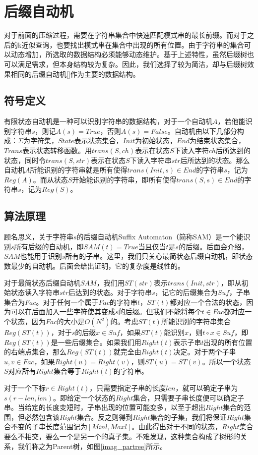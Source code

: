 ﻿\documentclass{sysuthesis}
\begin{document}
\chapter{后缀自动机}
对于前面的压缩过程，需要在字符串集合中快速匹配模式串的最长前缀。而对于之后的k近似查询，也要找出模式串在集合中出现的所有位置。由于字符串的集合可以动态增加，所选取的数据结构必须能够动态维护。基于上述特性，虽然后缀树也可以满足需求，但本身结构较为复杂。因此，我们选择了较为简洁，却与后缀树效果相同的后缀自动机[]作为主要的数据结构。



\section{符号定义}
有限状态自动机是一种可以识别字符串的数据结构，对于一个自动机$A$，若他能识别字符串$s$，则记$A(s) = True$，否则$A(s) = False$。自动机由以下几部分构成：$\Sigma$为字符集，$State$表示状态集合，$Init$为初始状态，$End$为结束状态集合，$Trans$表示状态转移函数。用$trans(S, ch)$表示在状态$S$下读入字符$ch$后所达到的状态，同时令$trans(S, str)$表示在状态$S$下读入字符串$str$后所达到的状态。那么自动机$A$所能识别的字符串就是所有使得$trans(Init, s) \in End$的字符串$s$，记为$Reg(A)$。而从状态$S$开始能识别的字符串，即所有使得$trans(S, s) \in End$的字符串$s$，记为$Reg(S)$。



\section{算法原理}
顾名思义，关于字符串$s$的后缀自动机Suffix Automaton（简称SAM）是一个能识别$s$所有后缀的自动机，即$SAM(t) = True$当且仅当$t$是$s$的后缀。后面会介绍，$SAM$也能用于识别$s$所有的子串。这里，我们只关心最简状态后缀自动机，即状态数最少的自动机。后面会给出证明，它的复杂度是线性的。\par
对于最简状态后缀自动机$SAM$，我们用$ST(str)$表示$trans(Init, str)$，即从初始状态读入字符串$str$后达到的状态。对于字符串$s$，记它的后缀集合为$Suf$，子串集合为$Fac$。对于任何一个属于$Fac$的字符串$t$，$ST(t)$都对应一个合法的状态，因为可以在后面加入一些字符使其变成$s$的后缀。但我们不能将每个$t \in Fac$都对应一个状态，因为$Fac$的大小是$O(N^2)$的。考虑$ST(t)$所能识别的字符串集合$Reg(ST(t))$，对于$s$的后缀$x \in Suf$，如果$ST(t)$能识别$x$，则$t \circ x \in Suf$，即$Reg(ST(t))$是一些后缀集合。如果我们用$Right(t)$表示子串$t$出现的所有位置的右端点集合，那么$Reg(ST(t))$就完全由$Right(t)$决定。对于两个子串$u, v \in Fac$，如果$Right(u) = Right(v)$，则$ST(u) = ST(v)$。所以一个状态$S$对应所有$Right$集合等于$Right(t)$的字符串。\par
对于一个下标$r \in Right(t)$，只需要指定子串的长度$len$，就可以确定子串为$s(r - len, len)$。即给定一个状态的$Right$集合，只需要子串长度便可以确定子串。当给定的长度变短时，子串出现的位置可能变多，以至于超出$Right$集合的范围，但必然包含该$Right$集合。反之则得到$Right$集合的子集，我们将保证$Right$集合不变的子串长度范围记为$[Minl, Maxl]$。由此得出对于不同的状态，$Right$集合要么不相交，要么一个是另一个的真子集。不难发现，这种集合构成了树形的关系，我们称之为Parent树，如图\ref{imag_partree}所示。\par
\end{document}
